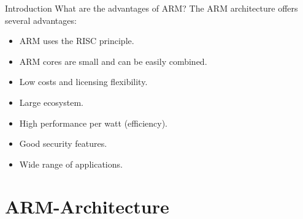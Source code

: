 \documentclass{beamer}
\begin{document}
\begin{frame}{Introduction}
	{What are the advantages of ARM?}
	The ARM architecture offers several advantages:
	\begin{itemize}
		\item ARM uses the RISC principle.
		\item ARM cores are small and can be easily combined.
		\item Low costs and licensing flexibility.
		\item Large ecosystem.
		\item High performance per watt (efficiency).
		\item Good security features.
		\item Wide range of applications.
	\end{itemize}
\end{frame} 
\section{ARM-Architecture}
\end{document}
